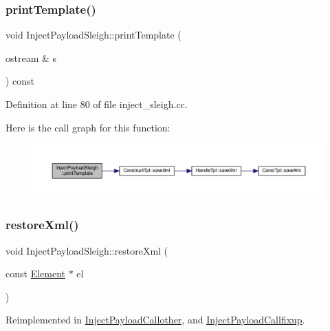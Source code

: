 \subsubsection{\texorpdfstring{printTemplate()}{printTemplate()}}
{\footnotesize\ttfamily void Inject\+Payload\+Sleigh\+::print\+Template (\begin{DoxyParamCaption}\item[{ostream \&}]{s }\end{DoxyParamCaption}) const\hspace{0.3cm}{\ttfamily [virtual]}}



Definition at line 80 of file inject\+\_\+sleigh.\+cc.

Here is the call graph for this function\+:
\nopagebreak
\begin{figure}[H]
\begin{center}
\leavevmode
\includegraphics[width=350pt]{class_inject_payload_sleigh_af501310c66ead549c7bd48456b0c8020_cgraph}
\end{center}
\end{figure}
\mbox{\label{class_inject_payload_sleigh_ae41de3f330c3cbb5327e94fcf3ae705c}} 
\subsubsection{\texorpdfstring{restoreXml()}{restoreXml()}}
{\footnotesize\ttfamily void Inject\+Payload\+Sleigh\+::restore\+Xml (\begin{DoxyParamCaption}\item[{const \mbox{\hyperlink{class_element}{Element}} $\ast$}]{el }\end{DoxyParamCaption})\hspace{0.3cm}{\ttfamily [virtual]}}



Reimplemented in \mbox{\hyperlink{class_inject_payload_callother_a1d09a05eebbf6db00fd72650b45b9b85}{Inject\+Payload\+Callother}}, and \mbox{\hyperlink{class_inject_payload_callfixup_a79e5f333168b25b8cd91e18e809029eb}{Inject\+Payload\+Callfixup}}.



